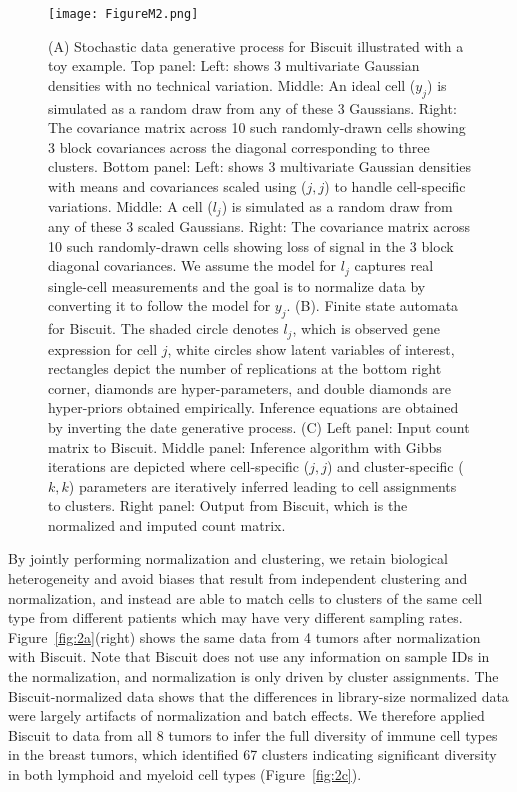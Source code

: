 \begin{figure}
\centering
\texttt{[image: FigureM2.png]}
\caption{(A) Stochastic data generative process for Biscuit illustrated with a toy example. Top panel: Left: shows 3 multivariate Gaussian densities with no technical variation. Middle: An ideal cell ($y_j$) is simulated as a random draw from any of these 3 Gaussians. Right: The covariance matrix across 10 such randomly-drawn cells showing 3 block covariances across the diagonal corresponding to three clusters.  
  Bottom panel: Left: shows 3 multivariate Gaussian densities with means and covariances scaled using ($j, j$) to handle cell-specific variations. 
  Middle: A cell ($l_j$) is simulated as a random draw from any of these 3 scaled Gaussians. 
  Right: The covariance matrix across 10 such randomly-drawn cells showing loss of signal in the 3 block diagonal covariances. 
  We assume the model for $l_j$ captures real single-cell measurements and the goal is to normalize data by converting it to follow the model for $y_j$. 
(B). Finite state automata for Biscuit. 
The shaded circle denotes $l_j$, which is observed gene expression for cell $j$, white circles show latent variables of interest, rectangles depict the number of replications at the bottom right corner, diamonds are hyper-parameters, and double diamonds are hyper-priors obtained empirically. Inference equations are obtained by inverting the date generative process. 
(C) Left panel: Input count matrix to Biscuit. Middle panel: Inference algorithm with Gibbs iterations are depicted where cell-specific ($j, j$) and cluster-specific ($k, k$) parameters are iteratively inferred leading to cell assignments to clusters. Right panel: Output from Biscuit, which is the normalized and imputed count matrix.
}
\label{fig:m2}
\end{figure}

By jointly performing normalization and clustering, we retain biological heterogeneity and avoid biases that result from independent clustering and normalization, and instead are able to match cells to clusters of the same cell type from different patients which may have very different sampling rates. 
Figure~\ref{fig:2a}(right) shows the same data from 4 tumors after normalization with Biscuit. 
Note that Biscuit does not use any information on sample IDs in the normalization, and normalization is only driven by cluster assignments. 
The Biscuit-normalized data shows that the differences in library-size normalized data were largely artifacts of normalization and batch effects. 
We therefore applied Biscuit to data from all 8 tumors to infer the full diversity of immune cell types in the breast tumors, which identified 67 clusters indicating significant diversity in both lymphoid and myeloid cell types (Figure~\ref{fig:2c}). %

